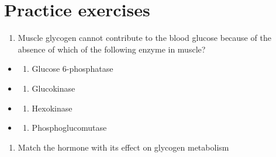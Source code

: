 \documentclass[
]{book}
\providecommand{\tightlist}{%
  \setlength{\itemsep}{0pt}\setlength{\parskip}{0pt}}
\begin{document}
\section{Practice exercises}\label{practice-exercises-3}

\begin{enumerate}
\def\labelenumi{\arabic{enumi}.}
\tightlist
\item
  Muscle glycogen cannot contribute to the blood glucose because of the absence of which of the following enzyme in muscle?
\end{enumerate}

\begin{itemize}
\tightlist
\item
  \begin{enumerate}
  \def\labelenumi{(\Alph{enumi})}
  \tightlist
  \item
    Glucose 6-phosphatase\\
  \end{enumerate}
\item
  \begin{enumerate}
  \def\labelenumi{(\Alph{enumi})}
  \setcounter{enumi}{1}
  \tightlist
  \item
    Glucokinase\\
  \end{enumerate}
\item
  \begin{enumerate}
  \def\labelenumi{(\Alph{enumi})}
  \setcounter{enumi}{2}
  \tightlist
  \item
    Hexokinase\\
  \end{enumerate}
\item
  \begin{enumerate}
  \def\labelenumi{(\Alph{enumi})}
  \setcounter{enumi}{3}
  \tightlist
  \item
    Phosphoglucomutase
  \end{enumerate}
\end{itemize}

\begin{enumerate}
\def\labelenumi{\arabic{enumi}.}
\setcounter{enumi}{1}
\tightlist
\item
  Match the hormone with its effect on glycogen metabolism
\end{enumerate}
\end{document}
